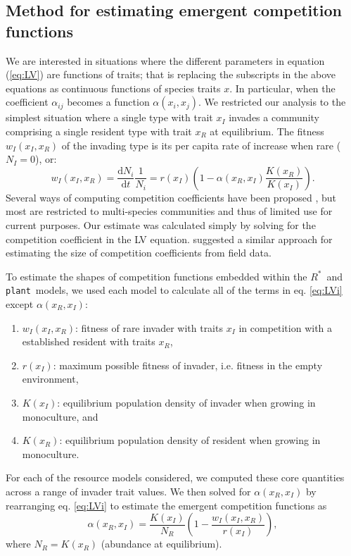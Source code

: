 \documentclass[a4paper,11pt]{article}
\newcommand{\ud}{\ensuremath{\mathrm{d}}}
\newcommand{\Rstar}{\ensuremath{R^*}}
\newcommand{\plant}{{\tt plant}}
\begin{document}
\subsection{Method for estimating emergent competition functions}

We are interested in situations where the different parameters in equation (\ref{eq:LV}) are functions of traits; that is replacing the subscripts in the above equations as continuous functions of species traits $x$. In particular, when the coefficient $\alpha_{ij}$ becomes a function $\alpha(x_i, x_j)$. We restricted our analysis to the simplest situation where a single type with trait $x_I$ invades a community comprising a single resident type with trait $x_R$ at equilibrium. The fitness $w_I(x_I, x_R)$ of the invading type is its per capita rate of increase when rare ($N_I = 0$), or: 
\begin{equation}\label{eq:LVi}
  w_I(x_I, x_R) = \frac{\ud N_i}{\ud t} \frac{1}{N_i} =
    r(x_I)\left(1 - \alpha(x_R, x_I) \frac{K(x_R)}{K(x_I)}\right).
\end{equation}
Several ways of computing competition coefficients have been proposed \citep[e.g.,][]{Abrams-1987,Abrams-2008}, but most are restricted to multi-species communities and thus of limited use for current purposes. Our estimate was calculated simply by solving for the competition coefficient in the LV equation. \citet{Ricklefs-1973} suggested a similar approach for estimating the size of competition coefficients from field data. 

To estimate the shapes of competition functions embedded within the \Rstar\ and \plant\ models, we used each model to calculate all of the terms in eq. \ref{eq:LVi} except $\alpha(x_R, x_I)$:
\begin{enumerate}
\item $w_I(x_I, x_R)$: fitness of rare invader with traits $x_I$ in competition with a established resident with traits $x_R$,
\item $r(x_I)$: maximum possible fitness of invader, i.e. fitness in the empty environment,
\item $K(x_I)$: equilibrium population density of invader when growing in monoculture, and
\item $K(x_R)$: equilibrium population density of resident when growing in monoculture.
\end{enumerate}

For each of the resource models considered, we computed these core quantities across a range of invader trait values. We then solved for $\alpha(x_R, x_I)$ by rearranging eq. \ref{eq:LVi} to estimate the emergent competition functions as
\begin{equation} \label{eq:alpha}
  \alpha(x_R, x_I) = \frac{K(x_I)}{N_R} \left(1 - \frac{w_I(x_I, x_R)}{r(x_I)}\right),
\end{equation}
where $N_R = K(x_R)$ (abundance at equilibrium). 
\end{document}
